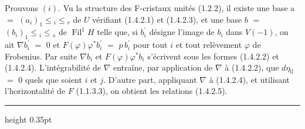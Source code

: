 \documentclass[9pt]{article}
\newcommand{\CanonText}[1]{\par{\fontsize{8.0}{9.35}\selectfont\RaggedRight #1\par}\vspace{2.2pt}}
\begin{document}
\begin{minipage}[t][\dimexpr\textheight-5pt\relax][t]{\textwidth}
\CanonText{Prouvons \((i)\). Vu la structure des F-cristaux unités (1.2.2), il existe une base a \(=\) \((a_{i})_{1}\leq{}_{i}\leq{}_{r}\) de \(U\) vérifiant (1.4.2.1) et (1.4.2.3), et une base \(b\) \(=\) \((b_{i})_{1}\leq{}_{i}\leq{}_{s}\) de \(\operatorname{Fil}^{1}H\) telle que, si \(b^{\prime}_{i}\) désigne l'image de \(b_{i}\) dans \(V(-1)\), on ait \(\nabla{}b^{\prime}_{i}\) \(=\) 0 et \(F(\varphi{})\varphi{}^{*}b^{\prime}_{i}\) \(=\) \(p\,b^{\prime}_{i}\) pour tout \(i\) et tout relèvement \(\varphi{}\) de Frobenius. Par suite \(\nabla{}b_{i}\) et \(F(\varphi{})\varphi{}^{*}b_{i}\) s'écrivent sous les formes (1.4.2.2) et (1.4.2.4). L'intégrabilité de \(\nabla{}\) entraîne, par application de \(\nabla{}\) à (1.4.2.2), que \(d\eta{}_{\mathrm{ij}}\) \(=\) 0 quels que soient \(i\) et \(j\). D'autre part, appliquant \(\nabla{}\) à (1.4.2.4), et utilisant l'horizontalité de \(F\) (1.1.3.3), on obtient les relations (1.4.2.5).}
\vfill
{\color{Accent}\hrule height 0.35pt}\vspace{3pt}
\end{minipage}
\newpage
\end{document}
